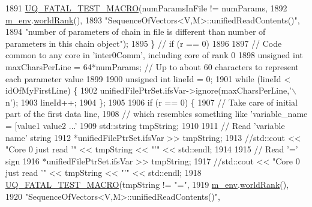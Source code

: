 \begin{DoxyCode}
1891               \hyperlink{_defines_8h_a56d63d18d0a6d45757de47fcc06f574d}{UQ\_FATAL\_TEST\_MACRO}(numParamsInFile != numParams,
1892                                   \hyperlink{class_q_u_e_s_o_1_1_base_vector_sequence_a8e8824d2a63c5a43bcc6473e3a0491e8}{m\_env}.\hyperlink{class_q_u_e_s_o_1_1_base_environment_a78b57112bbd0e6dd0e8afec00b40ffa7}{worldRank}(),
1893                                   \textcolor{stringliteral}{"SequenceOfVectors<V,M>::unifiedReadContents()"},
1894                                   \textcolor{stringliteral}{"number of parameters of chain in file is different than number of
       parameters in this chain object"});
1895             \} \textcolor{comment}{// if (r == 0)}
1896 
1897             \textcolor{comment}{// Code common to any core in 'inter0Comm', including core of rank 0}
1898             \textcolor{keywordtype}{unsigned} \textcolor{keywordtype}{int} maxCharsPerLine = 64*numParams; \textcolor{comment}{// Up to about 60 characters to represent each
       parameter value}
1899 
1900             \textcolor{keywordtype}{unsigned} \textcolor{keywordtype}{int} lineId = 0;
1901             \textcolor{keywordflow}{while} (lineId < idOfMyFirstLine) \{
1902               unifiedFilePtrSet.ifsVar->ignore(maxCharsPerLine,\textcolor{charliteral}{'\(\backslash\)n'});
1903               lineId++;
1904             \};
1905 
1906             \textcolor{keywordflow}{if} (r == 0) \{
1907               \textcolor{comment}{// Take care of initial part of the first data line,}
1908               \textcolor{comment}{// which resembles something like 'variable\_name = [value1 value2 ...'}
1909         std::string tmpString;
1910 
1911               \textcolor{comment}{// Read 'variable name' string}
1912               *unifiedFilePtrSet.ifsVar >> tmpString;
1913           \textcolor{comment}{//std::cout << "Core 0 just read '" << tmpString << "'" << std::endl;}
1914 
1915               \textcolor{comment}{// Read '=' sign}
1916               *unifiedFilePtrSet.ifsVar >> tmpString;
1917         \textcolor{comment}{//std::cout << "Core 0 just read '" << tmpString << "'" << std::endl;}
1918               \hyperlink{_defines_8h_a56d63d18d0a6d45757de47fcc06f574d}{UQ\_FATAL\_TEST\_MACRO}(tmpString != \textcolor{stringliteral}{"="},
1919                                   \hyperlink{class_q_u_e_s_o_1_1_base_vector_sequence_a8e8824d2a63c5a43bcc6473e3a0491e8}{m\_env}.\hyperlink{class_q_u_e_s_o_1_1_base_environment_a78b57112bbd0e6dd0e8afec00b40ffa7}{worldRank}(),
1920                                   \textcolor{stringliteral}{"SequenceOfVectors<V,M>::unifiedReadContents()"},

\end{DoxyCode}
